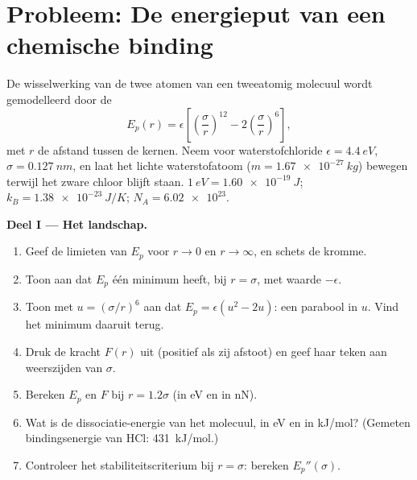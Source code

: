 \section{Probleem: De energieput van een chemische binding}

\begin{problem}
\label{pb:b1:work-and-energy:1}
De wisselwerking van de twee atomen van een tweeatomig molecuul wordt gemodelleerd door
de 
\[
E_p(r) = \epsilon\left[\left(\frac{\sigma}{r}\right)^{12} - 2\left(\frac{\sigma}{r}\right)^{6}\right],
\]
met $r$ de afstand tussen de kernen. Neem voor waterstofchloride
$\epsilon = \qty{4.4}{eV}$, $\sigma = \qty{0.127}{nm}$, en laat het lichte
waterstofatoom ($m = \qty{1.67e-27}{kg}$) bewegen terwijl het zware chloor
blijft staan. $\qty{1}{eV} = \qty{1.60e-19}{J}$; $k_B = \qty{1.38e-23}{J/K}$;
$N_A = \num{6.02e23}$.

\medskip
\noindent\textbf{Deel I --- Het landschap.}
\begin{enumerate}
  \item Geef de limieten van $E_p$ voor $r \to 0$ en $r \to \infty$, en
        schets de kromme.
  \item Toon aan dat $E_p$ één minimum heeft, bij $r = \sigma$, met waarde
        $-\epsilon$.
  \item Toon met $u = (\sigma/r)^6$ aan dat $E_p = \epsilon(u^2 - 2u)$: een
        parabool in $u$. Vind het minimum daaruit terug.
  \item Druk de kracht $F(r)$ uit (positief als zij afstoot) en geef haar
        teken aan weerszijden van $\sigma$.
  \item Bereken $E_p$ en $F$ bij $r = 1.2\sigma$ (in eV en in nN).
  \item Wat is de dissociatie-energie van het molecuul, in eV en in
        \unit{kJ/mol}? (Gemeten bindingsenergie van HCl: \qty{431}{kJ/mol}.)
  \item Controleer het stabiliteitscriterium bij $r = \sigma$: bereken
        $E_p''(\sigma)$.
\end{enumerate}


\end{problem}
